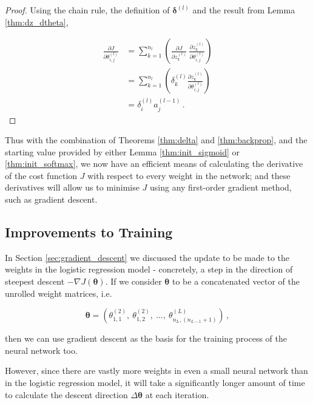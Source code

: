 \documentclass{article}[11pt]
\begin{document}
        \begin{proof}
        
            Using the chain rule, the definition of $\boldsymbol{\delta}^{(l)}$ and the result from Lemma \ref{thm:dz_dtheta},
            
            $$ \begin{aligned}
            \frac{\partial J}{\partial \theta^{(l)}_{i,j}}
            &= \sum_{k=1}^{n_l} \left( \frac{\partial J}{\partial z^{(l)}_k} \ \frac{\partial z^{(l)}_k}{\partial \theta^{(l)}_{i,j}} \right) \\
            &= \sum_{k=1}^{n_l} \left( \delta^{(l)}_k \frac{\partial z^{(l)}_k}{\partial \theta^{(l)}_{i,j}} \right) \\
            &= \delta^{(l)}_i a^{(l-1)}_j \,.
            \end{aligned}$$
        
        \end{proof}
        
        
        Thus with the combination of Theorems \ref{thm:delta} and \ref{thm:backprop}, and the starting value provided by either Lemma \ref{thm:init_sigmoid} or \ref{thm:init_softmax}, we now have an efficient means of calculating the derivative of the cost function $J$ with respect to every weight in the network; and these derivatives will allow us to minimise $J$ using any first-order gradient method, such as gradient descent.
        
        

    \subsection{Improvements to Training} \label{sec:improvements}
        
        In Section \ref{sec:gradient_descent} we discussed the update to be made to the weights in the logistic regression model - concretely, a step in the direction of steepest descent $- \nabla J(\boldsymbol{\theta})$. If we consider $\boldsymbol{\theta}$ to be a concatenated vector of the unrolled weight matrices, i.e.
        
        $$
        \boldsymbol{\theta} = \left( \theta^{(2)}_{1,1}, \ \theta^{(2)}_{1,2}, \ \ldots, \ \theta^{(L)}_{n_L, (n_{L-1}+1)} \right) \,,
        $$
        
        then we can use gradient descent as the basis for the training process of the neural network too.
        
        However, since there are vastly more weights in even a small neural network than in the logistic regression model, it will take a significantly longer amount of time to calculate the descent direction $\Delta \boldsymbol{\theta}$ at each iteration.
        
\end{document}
